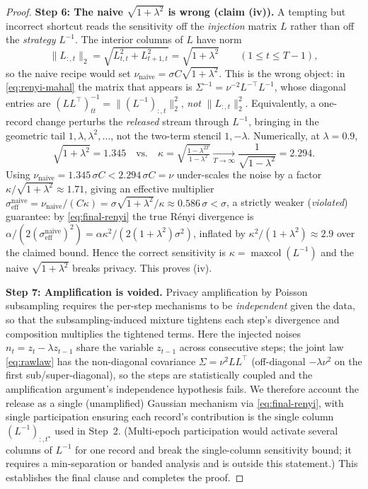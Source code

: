 \begin{proof}
\medskip
\noindent\textbf{Step 6: The naive $\sqrt{1+\lambda^2}$ is wrong (claim (iv)).}
A tempting but incorrect shortcut reads the sensitivity off the \emph{injection} matrix $L$ rather than
off the \emph{strategy} $L^{-1}$. The interior columns of $L$ have norm
\[
\big\|L_{:,t}\big\|_2=\sqrt{L_{t,t}^2+L_{t+1,t}^2}=\sqrt{1+\lambda^2}\qquad(1\le t\le T-1),
\]
so the naive recipe would set $\nu_{\mathrm{naive}}=\sigma C\sqrt{1+\lambda^2}$. This is the wrong
object: in \eqref{eq:renyi-mahal} the matrix that appears is
$\Sigma^{-1}=\nu^{-2}L^{-\top}L^{-1}$, whose diagonal entries are
$(LL^\top)^{-1}_{tt}=\|(L^{-1})_{:,t}\|_2^2$, \emph{not} $\|L_{:,t}\|_2^2$. Equivalently, a one-record
change perturbs the \emph{released} stream through $L^{-1}$, bringing in the geometric tail
$1,\lambda,\lambda^2,\dots$, not the two-term stencil $1,-\lambda$. Numerically, at $\lambda=0.9$,
\[
\sqrt{1+\lambda^2}=1.345\quad\text{vs.}\quad
\kappa=\sqrt{\tfrac{1-\lambda^{2T}}{1-\lambda^2}}\xrightarrow[T\to\infty]{}\frac{1}{\sqrt{1-\lambda^2}}=2.294 .
\]
Using $\nu_{\mathrm{naive}}=1.345\,\sigma C<2.294\,\sigma C=\nu$ under-scales the noise by a factor
$\kappa/\sqrt{1+\lambda^2}\approx1.71$, giving an effective multiplier
$\sigma_{\mathrm{eff}}^{\mathrm{naive}}=\nu_{\mathrm{naive}}/(C\kappa)=\sigma\sqrt{1+\lambda^2}/\kappa
\approx 0.586\,\sigma<\sigma$, a strictly weaker (\emph{violated}) guarantee: by \eqref{eq:final-renyi}
the true R\'enyi divergence is $\alpha/(2(\sigma_{\mathrm{eff}}^{\mathrm{naive}})^2)
=\alpha\kappa^2/(2(1+\lambda^2)\sigma^2)$, inflated by $\kappa^2/(1+\lambda^2)\approx2.9$ over the
claimed bound. Hence the correct sensitivity is $\kappa=\operatorname{maxcol}(L^{-1})$ and the naive
$\sqrt{1+\lambda^2}$ breaks privacy. This proves (iv).

\medskip
\noindent\textbf{Step 7: Amplification is voided.}
Privacy amplification by Poisson subsampling requires the per-step mechanisms to be \emph{independent}
given the data, so that the subsampling-induced mixture tightens each step's divergence and composition
multiplies the tightened terms. Here the injected noises $n_t=z_t-\lambda z_{t-1}$ share the variable
$z_{t-1}$ across consecutive steps; the joint law \eqref{eq:rawlaw} has the non-diagonal covariance
$\Sigma=\nu^2 LL^\top$ (off-diagonal $-\lambda\nu^2$ on the first sub/super-diagonal), so the steps are
statistically coupled and the amplification argument's independence hypothesis fails. We therefore
account the release as a single (unamplified) Gaussian mechanism via \eqref{eq:final-renyi}, with single
participation ensuring each record's contribution is the single column $(L^{-1})_{:,t^\star}$ used in
Step~2. (Multi-epoch participation would activate several columns of $L^{-1}$ for one record and break
the single-column sensitivity bound; it requires a min-separation or banded analysis and is outside
this statement.) This establishes the final clause and completes the proof.
\end{proof}


